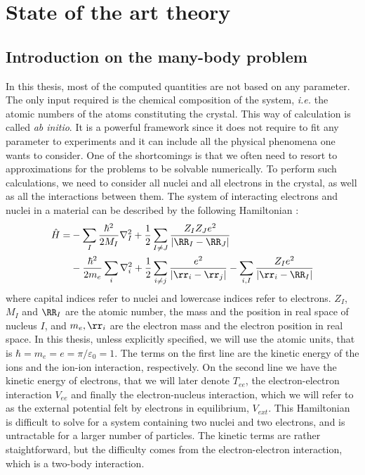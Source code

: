 \chapter{ State of the art theory}
\chaptertoc{}
%
\linenumbers

%
\section{Introduction on the many-body problem} \label{sec:BO_approx}
In this thesis, most of the computed quantities are not based on any parameter. The only input required is the chemical composition of the system, \textit{i.e.} the atomic numbers of the atoms constituting the crystal. This way of calculation is called \textit{ab initio}. It is a powerful framework since it does not require to fit any parameter to experiments and it can include all the physical phenomena one wants to consider. One of the shortcomings is that we often need to resort to approximations for the problems to be solvable numerically.
To perform such calculations, we need to consider all nuclei and all electrons in the crystal, as well as all the interactions between them. The system of interacting electrons and nuclei in a material can be described by the following Hamiltonian :
\begin{align}
	\hat{H} = &- \sum_I \frac{\hbar^2}{2 M_I} \nabla^2_I + \frac{1}{2} \sum_{I\neq J} \frac{Z_I Z_J e^2}{\left| \RR_I - \RR_J \right|} \nonumber \\
	&- \frac{\hbar^2}{2m_e} \sum_i \nabla^2_i + \frac{1}{2} \sum_{i\neq j} \frac{e^2}{\left| \rr_i - \rr_j \right|} - \sum_{i,I} \frac{Z_I e^2}{\left|\rr_i - \RR_I \right|}
\end{align}
where capital indices refer to nuclei and lowercase indices refer to electrons. $Z_I$, $M_I$ and $\RR_I$ are the atomic number, the mass and the position in real space of nucleus $I$, and $m_e,\rr_i$ are the electron mass and the electron position in real space. In this thesis, unless explicitly specified, we will use the atomic units, that is $\hbar = m_e = e =\pi/\varepsilon_0 =1$.
The terms on the first line are the kinetic energy of the ions and the ion-ion interaction, respectively. On the second line we have the kinetic energy of electrons, that we will later denote $T_{ee}$, the electron-electron interaction $V_{ee}$ and finally the electron-nucleus interaction, which we will refer to as the external potential felt by electrons in equilibrium, $V_{ext}$. This Hamiltonian is difficult to solve for a system containing two nuclei and two electrons, and is untractable for a larger number of particles. The kinetic terms are rather staightforward, but the difficulty comes from the electron-electron interaction, which is a two-body interaction.
